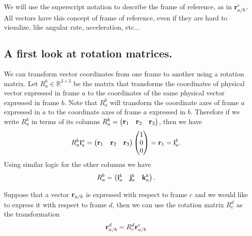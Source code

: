 We will use the superscript notation to describe the frame of reference,
as in $\mathbf{r}_{a/b}^{c}$.
 All vectors have this concept
of frame of reference, even if they are hard to visualize, like angular
rate, acceleration, etc...

\subsection{A first look at rotation matrices.}
We can transform vector coordinates from one frame to another using a rotation matrix.  Let $R_a^b\in\mathbb{R}^{3\times 3}$ be the matrix that transforms the coordinates of physical vector expressed in frame $a$ to the coordinates of the same physical vector expressed in frame $b$.  
Note that $R_a^b$ will transform the coordinate axes of frame $a$ expressed in $a$ to the coordinate axes of frame $a$ expressed in $b$.  Therefore if we write $R_a^b$ in terms of its columns $R_a^b = \begin{pmatrix}\mathbf{r}_1 & \mathbf{r}_2 & \mathbf{r}_3 \end{pmatrix}$, then we have
\[
R_a^b \mathbf{i}_a^a =  \begin{pmatrix}\mathbf{r}_1 & \mathbf{r}_2 & \mathbf{r}_3 \end{pmatrix} \begin{pmatrix} 1 \\ 0 \\ 0 \end{pmatrix} 
= \mathbf{r}_1 
= \mathbf{i}_a^b.
\]
Using similar logic for the other columns we have
\[
R_a^b = \begin{pmatrix} \mathbf{i}_a^b & \mathbf{j}_a^b & \mathbf{k}_a^b \end{pmatrix}.
\]

Suppose that a vector $\mathbf{r}_{a/b}$ is expressed with respect to frame $c$ and we would like to express it with respect to frame $d$, then we can use the rotation matrix $R_c^d$ as the transformation
\[
\mathbf{r}_{a/b}^{d}=R_{c}^{d}\mathbf{r}_{a/b}^{c}
\]
%


